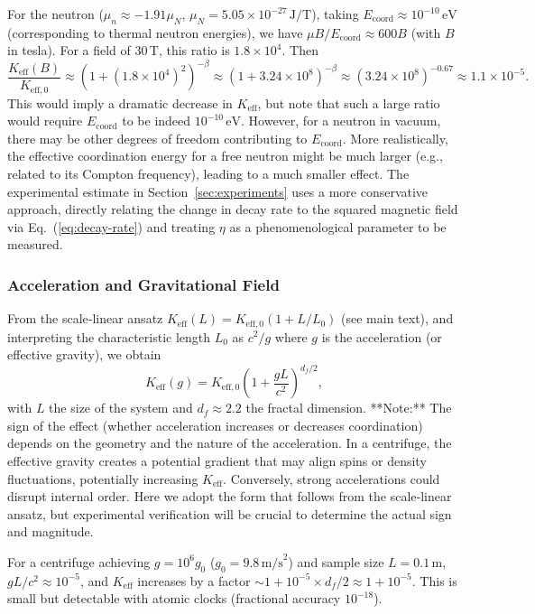 \documentclass[12pt]{article}
\theoremstyle{remark}
\newcommand{\Keff}{K_{\mathrm{eff}}}
\newcommand{\Keffzero}{K_{\mathrm{eff},0}}
\newcommand{\df}{d_{\!f}}
\begin{document}
	For the neutron (\(\mu_n \approx -1.91\mu_N\), \(\mu_N = 5.05\times 10^{-27}\,\text{J/T}\)), taking \(E_{\mathrm{coord}} \approx 10^{-10}\,\text{eV}\) (corresponding to thermal neutron energies), we have \(\mu B / E_{\mathrm{coord}} \approx 600 B\) (with \(B\) in tesla). For a field of \(30\,\text{T}\), this ratio is \(1.8\times10^4\). Then
	\[
	\frac{\Keff(B)}{\Keffzero} \approx (1 + (1.8\times10^4)^2)^{-\beta} \approx (1 + 3.24\times10^8)^{-\beta} \approx (3.24\times10^8)^{-0.67} \approx 1.1\times10^{-5}.
	\]
	This would imply a dramatic decrease in \(\Keff\), but note that such a large ratio would require \(E_{\mathrm{coord}}\) to be indeed \(10^{-10}\,\text{eV}\). However, for a neutron in vacuum, there may be other degrees of freedom contributing to \(E_{\mathrm{coord}}\). More realistically, the effective coordination energy for a free neutron might be much larger (e.g., related to its Compton frequency), leading to a much smaller effect. The experimental estimate in Section~\ref{sec:experiments} uses a more conservative approach, directly relating the change in decay rate to the squared magnetic field via Eq.~(\ref{eq:decay-rate}) and treating \(\eta\) as a phenomenological parameter to be measured.
	
	\subsubsection{Acceleration and Gravitational Field}
	
	From the scale‑linear ansatz \(\Keff(L) = \Keffzero (1 + L/L_0)\) (see main text), and interpreting the characteristic length \(L_0\) as \(c^2/g\) where \(g\) is the acceleration (or effective gravity), we obtain
	\begin{equation}
		\Keff(g) = \Keffzero \left(1 + \frac{gL}{c^2}\right)^{\df/2},
		\label{eq:keff-g}
	\end{equation}
	with \(L\) the size of the system and \(\df \approx 2.2\) the fractal dimension. **Note:** The sign of the effect (whether acceleration increases or decreases coordination) depends on the geometry and the nature of the acceleration. In a centrifuge, the effective gravity creates a potential gradient that may align spins or density fluctuations, potentially increasing \(\Keff\). Conversely, strong accelerations could disrupt internal order. Here we adopt the form that follows from the scale‑linear ansatz, but experimental verification will be crucial to determine the actual sign and magnitude.
	
	For a centrifuge achieving \(g = 10^6g_0\) (\(g_0 = 9.8\,\text{m/s}^2\)) and sample size \(L = 0.1\,\text{m}\), \(gL/c^2 \approx 10^{-5}\), and \(\Keff\) increases by a factor \(\sim 1 + 10^{-5}\times\df/2 \approx 1 + 10^{-5}\). This is small but detectable with atomic clocks (fractional accuracy \(10^{-18}\)).
	
\end{document}
